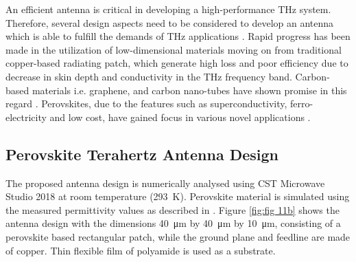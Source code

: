 \documentclass[12pt]{suhbook}
\begin{document}
 An efficient antenna is critical in developing a high-performance THz system. Therefore, several design aspects need to be considered to develop an antenna which is able to fulfill the demands of THz applications \cite{chen2016research}. Rapid progress has been made in the utilization of low-dimensional materials moving on from traditional copper-based radiating patch, which generate high loss and poor efficiency due to decrease in skin depth and conductivity in the THz frequency band. Carbon-based materials i.e. graphene, and carbon nano-tubes have shown promise in this regard \cite{naghdehforushha2017design}. Perovskites, due to the features such as superconductivity, ferro-electricity and low cost, have gained focus in various novel applications \cite{huang2014low}.
%  
% 
% 
\subsection{Perovskite Terahertz Antenna Design}
% 
The proposed antenna design is numerically analysed using CST Microwave Studio 2018 at room temperature (\SI{293}{\kelvin}). Perovskite material is simulated using the measured permittivity values as described in \cite{green2014emergence}. Figure \ref{fig:fig 11b} shows the antenna design with the dimensions \SI{40}{\um} by \SI{40}{\um} by \SI{10}{\um}, consisting of a perovskite based rectangular patch, while the ground plane and feedline are made of copper. Thin flexible film of polyamide is used as a substrate.
% 
\end{document}
